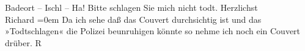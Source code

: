 \begin{ledgroupsized}[t]{13cm}
                  Bade{\pb}ort – Ischl – Ha! Bitte schlagen Sie mich nicht todt.\pend
           \pstart
           Herzlichst{\\[\baselineskip]}\spacefill\mbox{Richard}\pend
           \leftskip=0em{}\pstart
           \noindent{}{\pb}Da ich sehe daß das Couvert
                  durchsichtig ist und das »Todtschlagen« die Polizei beunruhigen könnte so nehme
                  ich noch ein Couvert drüber.\pend
           \pstart
           \raggedleft{}R\pend
           \endnumbering{}\end{ledgroupsized}  \newcommand{\dateiname}{L00594}\newcommand{\titel}{Richard Beer-Hofmann an Arthur Schnitzler, 19. 9. 1896}\newcommand{\editorInnen}{Martin Anton Müller und Gerd-Hermann Susen}
      